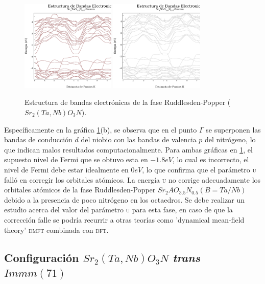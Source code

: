 \begin{figure}[H]
    \centering
    \includegraphics[width=0.4\textwidth]{Figs/bandas-con-u_ta35.eps}
    \includegraphics[width=0.4\textwidth]{Figs/bandas-con-u_nb35.eps}
    \caption{Estructura de bandas electrónicas de la fase Ruddlesden-Popper ($Sr_{2}(Ta,Nb)O_{3}N$).}
    \label{Fig. bandas_35}
\end{figure}

Específicamente en la gráfica \ref{Fig. bandas_35}(b), se observa que en el punto $\Gamma$ se superponen las bandas de conducción $d$ del niobio con las bandas de valencia $p$ del nitrógeno, lo que indican malos resultados computacionalmente. Para ambas gráficas en \ref{Fig. bandas_35}, el supuesto nivel de Fermi que se obtuvo esta en $-1.8  eV$, lo cual es incorrecto, el nivel de Fermi debe estar idealmente en $0 eV$, lo que confirma que el parámetro \textsc{u} falló en corregir los orbitales atómicos. La energía \textsc{u} no corrige adecuadamente los orbitales atómicos de la fase Ruddlesden-Popper $Sr_{2}AO_{3.5}N_{0.5}(B=Ta/Nb)$ debido a la presencia de poco nitrógeno en los octaedros. Se debe realizar un estudio acerca del valor del parámetro \textsc{u} para esta fase, en caso de que la corrección falle se podría recurrir a otras teorías como 'dynamical mean-field theory' \textsc{dmft} combinada con \textsc{dft}.

\subsection{Configuración $Sr_{2}(Ta,Nb)O_{3}N$ \emph{trans} $Immm(71)$}

